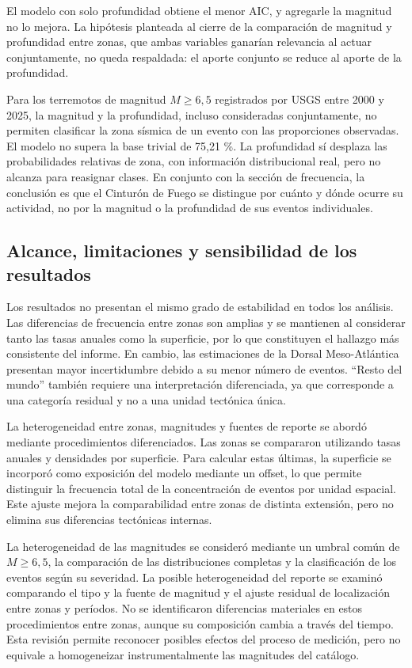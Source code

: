\documentclass[
  spanish,
  letterpaper,
  DIV=11,
  numbers=noendperiod]{scrartcl}
\begin{document}
El modelo con solo profundidad obtiene el menor AIC, y agregarle la
magnitud no lo mejora. La hipótesis planteada al cierre de la
comparación de magnitud y profundidad entre zonas, que ambas variables
ganarían relevancia al actuar conjuntamente, no queda respaldada: el
aporte conjunto se reduce al aporte de la profundidad.

Para los terremotos de magnitud \(M \geq 6{,}5\) registrados por USGS
entre 2000 y 2025, la magnitud y la profundidad, incluso consideradas
conjuntamente, no permiten clasificar la zona sísmica de un evento con
las proporciones observadas. El modelo no supera la base trivial de
75,21 \%. La profundidad sí desplaza las probabilidades relativas de
zona, con información distribucional real, pero no alcanza para
reasignar clases. En conjunto con la sección de frecuencia, la
conclusión es que el Cinturón de Fuego se distingue por cuánto y dónde
ocurre su actividad, no por la magnitud o la profundidad de sus eventos
individuales.

\subsection{Alcance, limitaciones y sensibilidad de los
resultados}\label{sec-res-sensibilidad}

Los resultados no presentan el mismo grado de estabilidad en todos los
análisis. Las diferencias de frecuencia entre zonas son amplias y se
mantienen al considerar tanto las tasas anuales como la superficie, por
lo que constituyen el hallazgo más consistente del informe. En cambio,
las estimaciones de la Dorsal Meso-Atlántica presentan mayor
incertidumbre debido a su menor número de eventos. ``Resto del mundo''
también requiere una interpretación diferenciada, ya que corresponde a
una categoría residual y no a una unidad tectónica única.

La heterogeneidad entre zonas, magnitudes y fuentes de reporte se abordó
mediante procedimientos diferenciados. Las zonas se compararon
utilizando tasas anuales y densidades por superficie. Para calcular
estas últimas, la superficie se incorporó como exposición del modelo
mediante un offset, lo que permite distinguir la frecuencia total de la
concentración de eventos por unidad espacial. Este ajuste mejora la
comparabilidad entre zonas de distinta extensión, pero no elimina sus
diferencias tectónicas internas.

La heterogeneidad de las magnitudes se consideró mediante un umbral
común de \(M \geq 6{,}5\), la comparación de las distribuciones
completas y la clasificación de los eventos según su severidad. La
posible heterogeneidad del reporte se examinó comparando el tipo y la
fuente de magnitud y el ajuste residual de localización entre zonas y
períodos. No se identificaron diferencias materiales en estos
procedimientos entre zonas, aunque su composición cambia a través del
tiempo. Esta revisión permite reconocer posibles efectos del proceso de
medición, pero no equivale a homogeneizar instrumentalmente las
magnitudes del catálogo.
\end{document}
